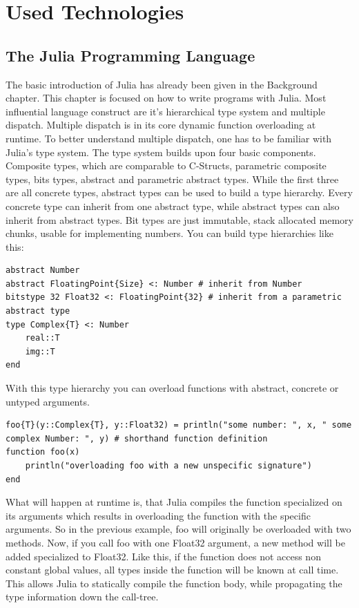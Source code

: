 \section{Used Technologies}

\subsection{The Julia Programming Language}
The basic introduction of Julia has already been given in the Background chapter.
This chapter is focused on how to write programs with Julia.
Most influential language construct are it's hierarchical type system and multiple dispatch.
Multiple dispatch is in its core dynamic function overloading at runtime. 
To better understand multiple dispatch, one has to be familiar with Julia's type system.
The type system builds upon four basic components. 
Composite types, which are comparable to C-Structs, parametric composite types, bits types, abstract and parametric abstract types.
While the first three are all concrete types, abstract types can be used to build a type hierarchy.
Every concrete type can inherit from one abstract type, while abstract types can also inherit from abstract types.
Bit types are just immutable, stack allocated memory chunks, usable for implementing numbers.
You can build type hierarchies like this:
\begin{lstlisting}
abstract Number
abstract FloatingPoint{Size} <: Number # inherit from Number
bitstype 32 Float32 <: FloatingPoint{32} # inherit from a parametric abstract type
type Complex{T} <: Number
    real::T
    img::T
end
\end{lstlisting}
With this type hierarchy you can overload functions with abstract, concrete or untyped arguments.
\begin{lstlisting}
foo{T}(y::Complex{T}, y::Float32) = println("some number: ", x, " some complex Number: ", y) # shorthand function definition
function foo(x)
    println("overloading foo with a new unspecific signature")
end
\end{lstlisting}
What will happen at runtime is, that Julia compiles the function specialized on its arguments which results in overloading the function with the specific arguments.
So in the previous example, foo will originally be overloaded with two methods. 
Now, if you call foo with one Float32 argument, a new method will be added specialized to Float32.
Like this, if the function does not access non constant global values, all types inside the function will be known at call time.
This allows Julia to statically compile the function body, while propagating the type information down the call-tree.

